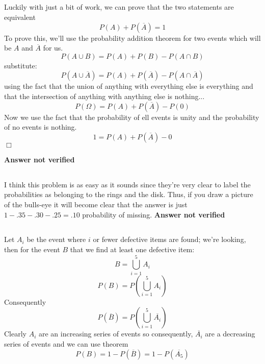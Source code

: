 \subsection{}
Luckily with just a bit of work, we can prove that the two statements are equivalent
\begin{equation}
	P(A) + P(\overline{A}) = 1
\end{equation}
To prove this, we'll use the probability addition theorem for two events which will be $A$ and $\overline{A}$ for us.
\begin{equation}
	P(A \cup B) = P(A) + P(B) - P(A \cap B)
\end{equation}
substitute:
\begin{equation}
	P(A \cup \overline{A}) = P(A) + P(\overline{A}) - P(A \cap \overline{A})
\end{equation}
using the fact that the union of anything with everything else is everything and that the intersection of anything with anything else is nothing...
\begin{equation}
	P(\Omega) = P(A) + P(\overline{A}) - P(0)
\end{equation}
Now we use the fact that the probability of ell events is unity and the probability of no events is nothing.
\begin{equation}
	1 = P(A) + P(\overline{A}) - 0
\end{equation}
$\Box$

\textbf{Answer not verified}


\subsection{}

I think this problem is as easy as it sounds since they're very clear to label the probabilities as belonging to the rings and the disk.  Thus, if you draw a picture of the bulls-eye it will become clear that the answer is just $1-.35-.30-.25=.10$ probability of missing.
\textbf{Answer not verified}

\subsection{}

Let $A_i$ be the event where $i$ or fewer defective items are found; we're looking, then for the event $B$ that we find at least one defective item:
\begin{equation}
	B = \bigcup_{i=1}^5 A_i
\end{equation}
\begin{equation}
	P(B) = P \left( \bigcup_{i=1}^5 A_i  \right)
\end{equation}
Consequently
\begin{equation}
	P(\overline{B}) = P \left( \bigcup_{i=1}^5 \overline{A_i}  \right)
\end{equation}
Clearly $A_i$ are an increasing series of events so consequently, $\overline{A_i}$ are a decreasing series of events and we can use theorem 
\begin{equation}
	P(B) = 1- P(\overline{B}) = 1- P ( \overline{A_5} )
\end{equation}

